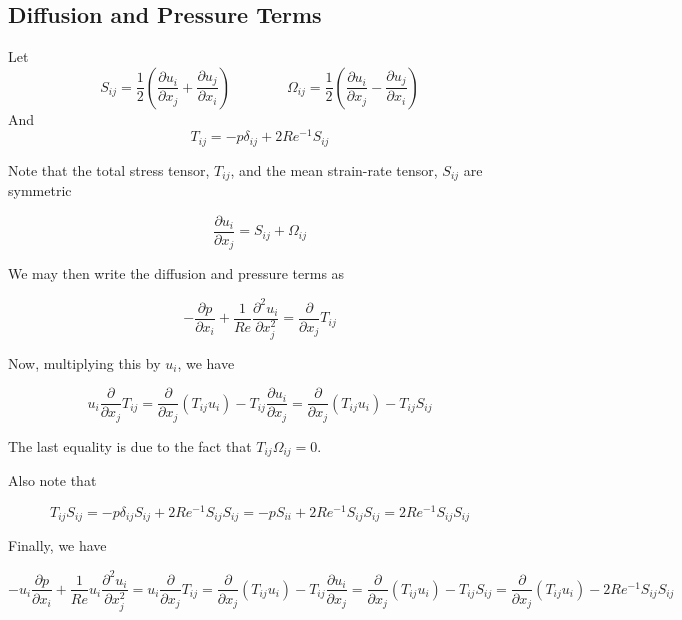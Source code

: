 \documentclass[11pt]{article}
\newcommand{\PD}{\partial}
\begin{document}
\subsection{Diffusion and Pressure Terms}
Let
\begin{equation}
	S_{ij} 
	=
	\frac{1}{2}
	\left(
	\frac{\PD u_i}{\PD x_j}
	+
	\frac{\PD u_j}{\PD x_i}
	\right)
	\qquad \qquad
	\Omega_{ij} 
	=
	\frac{1}{2}
	\left(
	\frac{\PD u_i}{\PD x_j}
	-
	\frac{\PD u_j}{\PD x_i}
	\right)
\end{equation}
And
\begin{equation}
	T_{ij}
	=
	-p \delta_{ij}
	+
	2 Re^{-1}
	S_{ij}
\end{equation}

Note that the total stress tensor, $T_{ij}$, and the mean strain-rate tensor, $S_{ij}$ are symmetric

\begin{equation}
	\frac{\PD u_i}{\PD x_j}
	= S_{ij} + \Omega_{ij}
\end{equation}

We may then write the diffusion and pressure terms as

\begin{equation}
	-\frac{\PD p}{\PD x_i}
	+ \frac{1}{Re}
	\frac{\PD^2 u_i}{\PD x_j^2}
	=
	\frac{\PD}{\PD x_j} T_{ij}
\end{equation}

Now, multiplying this by $u_i$, we have

\begin{equation}
	u_i \frac{\PD}{\PD x_j} T_{ij}
	=
	\frac{\PD}{\PD x_j} (T_{ij} u_i)
	-
	T_{ij} \frac{\PD u_i}{\PD x_j}
	=
	\frac{\PD}{\PD x_j} (T_{ij} u_i)
	- T_{ij} S_{ij}
\end{equation}

The last equality is due to the fact that $T_{ij} \Omega_{ij} = 0$.

Also note that

\begin{equation}
	T_{ij} S_{ij}
	=
	-p \delta_{ij} S_{ij}
	+ 2 Re^{-1} S_{ij} S_{ij}
	=
	-p S_{ii}
	+ 2 Re^{-1} S_{ij} S_{ij}
	=
	2 Re^{-1} S_{ij} S_{ij}
\end{equation}

Finally, we have

\begin{equation}
	-u_i \frac{\PD p}{\PD x_i}
	+ \frac{1}{Re}u_i
	\frac{\PD^2 u_i}{\PD x_j^2}
	=
	u_i \frac{\PD}{\PD x_j} T_{ij}
	=
	\frac{\PD}{\PD x_j} (T_{ij} u_i)
	-
	T_{ij} \frac{\PD u_i}{\PD x_j}
	=
	\frac{\PD}{\PD x_j} (T_{ij} u_i)
	- T_{ij} S_{ij}
	=
	\frac{\PD}{\PD x_j} (T_{ij} u_i)
	-
	2 Re^{-1} S_{ij} S_{ij}
\end{equation}
\end{document}
